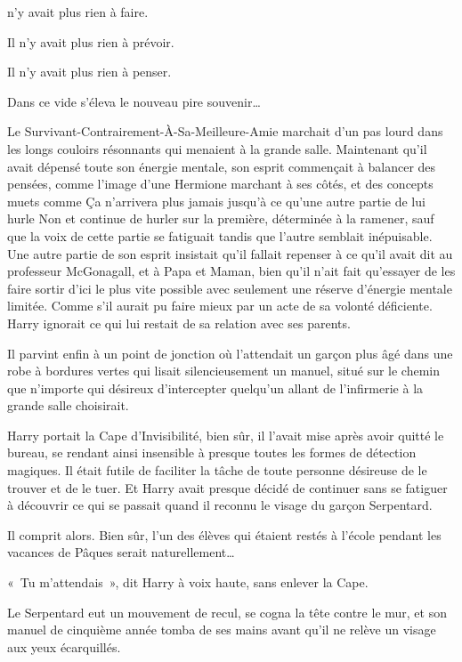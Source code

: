 
 n'y avait plus rien à faire.

\hplettrineextrapara
Il n'y avait plus rien à prévoir.

Il n'y avait plus rien à penser.

Dans ce vide s'éleva le nouveau pire souvenir…

Le Survivant-Contrairement-À-Sa-Meilleure-Amie marchait d'un pas lourd dans les longs couloirs résonnants qui menaient à la grande salle. Maintenant qu'il avait dépensé toute son énergie mentale, son esprit commençait à balancer des pensées, comme l'image d'une Hermione marchant à ses côtés, et des concepts muets comme Ça n'arrivera plus jamais jusqu'à ce qu'une autre partie de lui hurle Non et continue de hurler sur la première, déterminée à la ramener, sauf que la voix de cette partie se fatiguait tandis que l'autre semblait inépuisable. Une autre partie de son esprit insistait qu'il fallait repenser à ce qu'il avait dit au professeur McGonagall, et à Papa et Maman, bien qu'il n'ait fait qu'essayer de les faire sortir d'ici le plus vite possible avec seulement une réserve d'énergie mentale limitée. Comme s'il aurait pu faire mieux par un acte de sa volonté déficiente. Harry ignorait ce qui lui restait de sa relation avec ses parents.

Il parvint enfin à un point de jonction où l'attendait un garçon plus âgé dans une robe à bordures vertes qui lisait silencieusement un manuel, situé sur le chemin que n'importe qui désireux d'intercepter quelqu'un allant de l'infirmerie à la grande salle choisirait.

Harry portait la Cape d'Invisibilité, bien sûr, il l'avait mise après avoir quitté le bureau, se rendant ainsi insensible à presque toutes les formes de détection magiques. Il était futile de faciliter la tâche de toute personne désireuse de le trouver et de le tuer. Et Harry avait presque décidé de continuer sans se fatiguer à découvrir ce qui se passait quand il reconnu le visage du garçon Serpentard.

Il comprit alors. Bien sûr, l'un des élèves qui étaient restés à l'école pendant les vacances de Pâques serait naturellement…

«~Tu m'attendais~», dit Harry à voix haute, sans enlever la Cape.

Le Serpentard eut un mouvement de recul, se cogna la tête contre le mur, et son manuel de cinquième année tomba de ses mains avant qu'il ne relève un visage aux yeux écarquillés.

